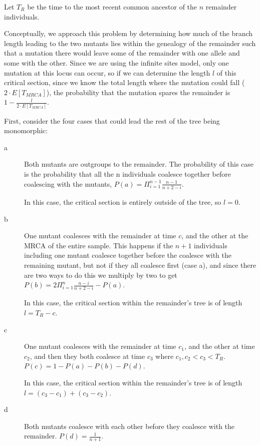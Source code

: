 \documentclass{article}
\begin{document}
Let $T_{R}$ be the time to the most recent common ancestor of the $n$ remainder
individuals.

Conceptually, we approach this problem by determining how much of the branch
length leading to the two mutants lies within the genealogy of the remainder
such that a mutation there would leave some of the remainder with one allele and
some with the other.  Since we are using the infinite sites model, only one
mutation at this locus can occur, so if we can determine the length $l$ of this
critical section, since we know the total length where the mutation could fall
($2 \cdot E[T_{MRCA}]$), the probability that the mutation spares the remainder is $1 -
\frac{l}{2 \cdot E[T_{MRCA}]}$.

First, consider the four cases that could lead the rest of the tree being
monomorphic:
\begin{description}
\item[a] Both mutants are outgroups to the remainder.  The probability of this
case is the probability that all the n individuals coalesce together before
coalescing with the mutants, $P(a) = \Pi_{i=1}^{n-1}\frac{n-1}{n+2-i}$.
\vspace{1in}

In this case, the critical section is entirely outside of the tree, so $l=0$.

\item[b] One mutant coalesces with the remainder at time $c$, and the other at
the MRCA of the entire sample.  This happens if the $n+1$ individuals including
one mutant coalesce together before the coalesce with the remaining mutant, but
not if they all coalesce first (case a), and since there are two ways to do this
we multiply by two to get $P(b) = 2 \Pi_{i=1}^n\frac{n-i}{n+2-i} - P(a)$.
\vspace{1in}

In this case, the critical section within the remainder's tree is of length $l =
T_R - c$.

\item[c] One mutant coalesces with the remainder at time $c_1$, and the other at
time $c_2$, and then they both coalesce at time $c_3$ where $c_1, c_2< c_3 < T_R$.
$P(c) = 1 - P(a) - P(b) - P(d)$.
\vspace{1in}

In this case, the critical section within the remainder's tree is of length $l =
(c_3 - c_1) + (c_3 - c_2)$.

\item[d] Both mutants coalesce with each other before they coalesce with the
remainder.  $P(d) = \frac{1}{n+1}$.
\vspace{1in}


\end{description}
\end{document}
